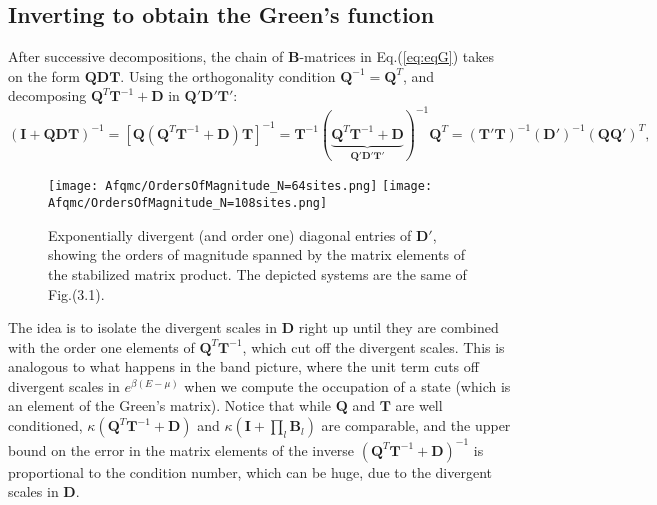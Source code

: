 \subsection{Inverting to obtain the Green's function}
\label{subsec:invertToG}

After successive decompositions, the chain of $\bm B$-matrices in Eq.(\ref{eq:eqG}) takes on the form $\bm Q \bm D \bm T$.
Using the orthogonality condition $\bm Q^{-1} = \bm Q^T$, and decomposing $\bm Q^T \bm T^{-1} + \bm D$ in $\bm Q' \bm D' \bm T'$:
\begin{equation}
( \bm I + \bm Q \bm D \bm T )^{-1} = [ \bm Q ( 
\bm Q^T \bm T^{-1} + \bm D ) \bm T ]^{-1} = \bm T^{-1} ( \underbrace{\bm Q^T \bm T^{-1} + \bm D}_{\bm Q' \bm D' \bm T'} )^{-1} \bm Q^T = ( \bm T' \bm T )^{-1} (\bm D')^{-1} (\bm Q \bm Q')^{T} ,
\end{equation}
\begin{figure}[H]\label{fig:divergences}
\texttt{[image: Afqmc/OrdersOfMagnitude\_N=64sites.png]}
\hspace{0.1cm}
\texttt{[image: Afqmc/OrdersOfMagnitude\_N=108sites.png]}
\caption[Exponentially divergent diagonal entries of $\bm D'$, showing the orders of magnitude spanned by the matrix elements of the stabilized matrix product.]{Exponentially divergent (and order one)  diagonal entries of $\bm D'$, showing the orders of magnitude spanned by the matrix elements of the stabilized matrix product.
The depicted systems are the same of Fig.(3.1). }
\end{figure}

The idea is to isolate the divergent scales in $\bm D$ right up until they are combined with the order one elements of $\bm Q^T \bm T^{-1}$, which cut off the divergent scales.
This is analogous to what happens in the band picture, where the unit term cuts off divergent scales in $e^{\beta ( E - \mu )}$ when we compute the occupation of a state (which is an element of the Green's matrix).
Notice that while $\bm Q$ and $\bm T$ are well conditioned, $\kappa ( \bm Q^T \bm T^{-1} + \bm D )$ and $\kappa ( \bm I + \prod_l \bm B_l )$ are comparable, and the upper bound on the error in the matrix elements of the inverse $( \bm Q^T \bm T^{-1} + \bm D )^{-1}$ is proportional to the condition number, which can be huge, due to the divergent scales in $\bm D$.

